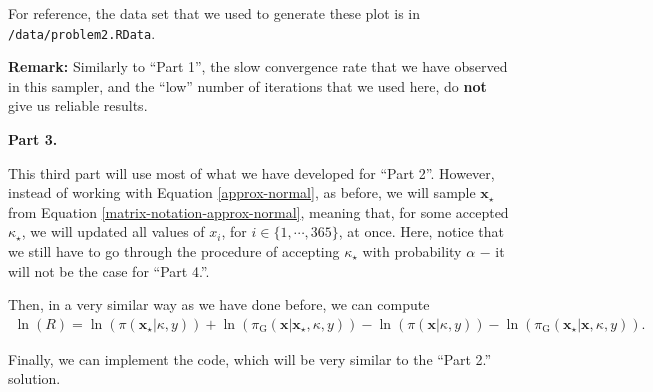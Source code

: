 \documentclass[12pt]{article}\usepackage[]{graphicx}\usepackage[]{color}
\begin{document}
For reference, the data set that we used to generate these plot is in \texttt{/data/problem2.RData}.

\vspace{12pt}

\textbf{Remark:} Similarly to ``Part 1'', the slow convergence rate that we have observed in this sampler, and the ``low'' number of iterations that we used here, do \textbf{not} give us reliable results.

\newpage

\textbf{Part 3.}

This third part will use most of what we have developed for ``Part 2''. However, instead of working with Equation \eqref{approx-normal}, as before, we will sample $\boldsymbol{x}_{\star}$ from Equation \eqref{matrix-notation-approx-normal}, meaning that, for some accepted $\kappa_{\star}$, we will updated all values of $x_i$, for $i \in \{1, \cdots, 365\}$, at once. Here, notice that we still have to go through the procedure of accepting $\kappa_{\star}$ with probability $\alpha$ $-$ it will not be the case for ``Part 4.''.

Then, in a very similar way as we have done before, we can compute
\begin{align*}
\ln(R) = \ln(\pi({\boldsymbol{x}}_{\star} | \kappa, y)) +  \ln(\pi_{\text{G}}(\boldsymbol{x} | \boldsymbol{x}_{\star}, \kappa, y)) - \ln(\pi(\boldsymbol{x} | \kappa, y)) - \ln(\pi_{\text{G}}({\boldsymbol{x}}_{\star} | \boldsymbol{x}, \kappa, y)).
\end{align*}

Finally, we can implement the code, which will be very similar to the ``Part 2.'' solution.
\end{document}
